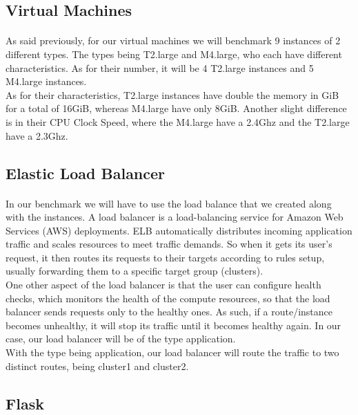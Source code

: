 \documentclass[12pt]{article}
\begin{document}
	\subsection{Virtual Machines}
		\paragraph{} As said previously, for our virtual machines we will benchmark 9 instances 
		of 2 different types. The types being T2.large and M4.large, who each have different 
		characteristics. As for their number, it will be 4 T2.large instances and 5 M4.large instances. \\

		As for their characteristics, T2.large  instances have double the memory in GiB for a total of 16GiB,
		whereas M4.large have only 8GiB. Another slight difference is in their CPU Clock Speed, where the 
		M4.large have a 2.4Ghz and the T2.large have a 2.3Ghz.
		\bigskip

	\subsection{Elastic Load Balancer}
		\paragraph{} In our benchmark we will have to use the load balance that we created along with the instances.
		A load balancer is a load-balancing service for Amazon Web Services (AWS) deployments. ELB automatically 
		distributes incoming application traffic and scales resources to meet traffic demands. So when it gets its user's
		request, it then routes its requests to their targets according to rules setup, usually forwarding them
		to a specific target group (clusters). \\

		One other aspect of the load balancer is that the user can configure health checks, which monitors the health of the 
		compute resources, so that the load balancer sends requests only to the healthy ones. As such, if a route/instance becomes
		unhealthy, it will stop its traffic until it becomes healthy again. In our case, our load balancer will be of the type 
		application. \\

		With the type being application, our load balancer will route the traffic to two distinct routes, being cluster1 and cluster2.
		\bigskip

	\subsection{Flask}
\end{document}
